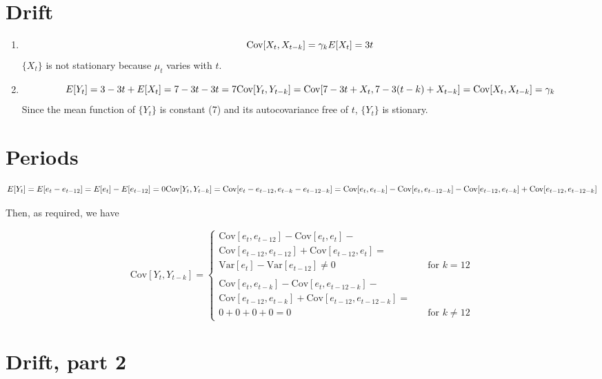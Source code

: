 \documentclass[]{book}
\providecommand{\tightlist}{%
  \setlength{\itemsep}{0pt}\setlength{\parskip}{0pt}}
\begin{document}
\section{Drift}\label{drift}

\begin{enumerate}
\def\labelenumi{(\alph{enumi})}
\tightlist
\item
  \[
    \text{Cov}[X_t, X_{t-k}] = \gamma_k\\
    E[X_t] = 3t
  \] \(\{X_t\}\) is not stationary because \(\mu_t\) varies with \(t\).
\item
  \[
    E[Y_t] = 3 - 3t+E[X_t] = 7 - 3t - 3t = 7\\
    \text{Cov}[Y_t, Y_{t-k}] = \text{Cov}[7-3t+X_t,7-3(t-k)+X_{t-k}] = \text{Cov}[X_t, X_{t-k}] = \gamma_k
  \] Since the mean function of \(\{Y_t\}\) is constant (7) and its
  autocovariance free of \(t\), \(\{Y_t\}\) is stionary.
\end{enumerate}

\section{Periods}\label{periods}

\[
  E[Y_t] = E[e_t - e_{t-12}] = E[e_t] - E[e_{t-12}] = 0\\
  \text{Cov}[Y_t, Y_{t-k}] = \text{Cov}[e_t - e_{t-12}, e_{t-k} - e_{t-12-k}] =\\
  \text{Cov}[e_t, e_{t-k}] - \text{Cov}[e_t, e_{t-12-k}] - \text{Cov}[e_{t-12}, e_{t-k}] + \text{Cov}[e_{t-12}, e_{t-12-k}]
\]

Then, as required, we have

\[ \text{Cov}[Y_t, Y_{t-k}] =
  \begin{cases}
    \text{Cov}[e_t, e_{t-12}] - \text{Cov}[e_t, e_t] -\\ \text{Cov}[e_{t-12}, e_{t-12}] + \text{Cov}[e_{t-12},e_t] =\\
      \text{Var}[e_t] - \text{Var}[e_{t-12}] \neq 0 & \quad \text{for }  k=12\\
      \\
    \text{Cov}[e_t, e_{t-k}] - \text{Cov}[e_t, e_{t-12-k}] -\\ \text{Cov}[e_{t-12}, e_{t-k}] + \text{Cov}[e_{t-12}, e_{t-12-k}] =\\
    0 + 0 + 0 + 0 = 0 & \quad \text{for } k \neq 12
  \end{cases}
\]

\section{Drift, part 2}\label{drift-part-2}
\end{document}

